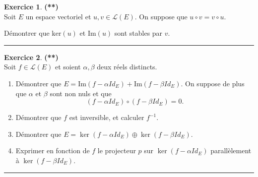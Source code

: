 \documentclass[a4paper,11pt]{article}
\theoremstyle{definition}
\newtheorem{exo}{Exercice} %
\begin{document}
	


\begin{exo}\textbf{(**)}\quad\\[0.25cm]%
Soit $E$ un espace vectoriel et $u,v\in\mathcal L(E)$. On suppose que $u\circ v=v\circ u$. 

Démontrer que $\textrm{ker}(u)$ et $\textrm{Im}(u)$ sont stables par $v$.%

	\centering
\rule{1\linewidth}{0.6pt}
\end{exo}

\begin{exo}\textbf{(**)}\quad\\[0.25cm]%
Soit $f\in\mathcal L(E)$ et soient $\alpha,\beta$ deux réels distincts.
\begin{enumerate}
	\item Démontrer que $E=\textrm{Im}(f-\alpha Id_E)+\textrm{Im}(f-\beta Id_E)$.\newline
	On suppose de plus que $\alpha$ et $\beta$ sont non nuls et que $$(f-\alpha Id_E)\circ (f-\beta Id_E)=0.$$
	\item Démontrer que $f$ est inversible, et calculer $f^{-1}$.
	\item Démontrer que $E=\ker(f-\alpha Id_E)\oplus \ker(f-\beta Id_E)$.
	\item Exprimer en fonction de $f$ le projecteur $p$ sur $\ker(f-\alpha Id_E)$ parallèlement
	à $\ker(f-\beta Id_E)$.
\end{enumerate}	
	
	\centering
	\rule{1\linewidth}{0.6pt}
\end{exo}


\newpage
\end{document}
